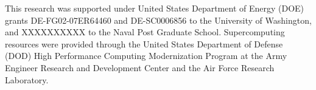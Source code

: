\documentclass[jgrga, draft]{agutex}
\begin{document}
\begin{article}
%
%
%
%
%
%
%

\begin{acknowledgments}
This research was supported under United States Department of Energy (DOE) grants DE-FG02-07ER64460 and DE-SC0006856 to the University of Washington, and XXXXXXXXXX to the Naval Post Graduate School.
Supercomputing resources were provided through the United States Department of Defense (DOD) High Performance Computing Modernization Program at the Army Engineer Research and Development Center and the Air Force Research Laboratory.
\end{acknowledgments}





%
%
%
%
%
%
%
%


\end{article}
\end{document}
